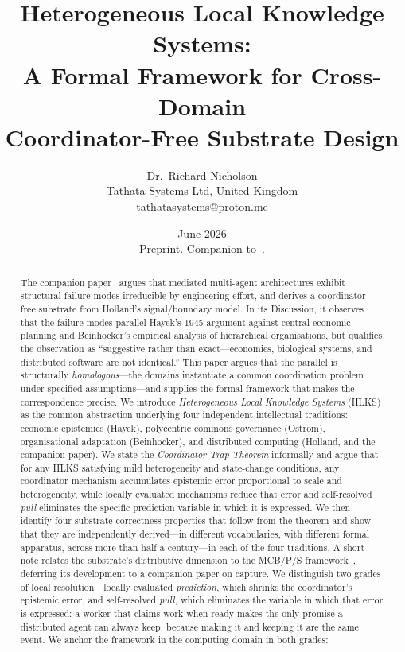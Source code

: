 \documentclass[11pt]{article}
\title{\textbf{Heterogeneous Local Knowledge Systems:\\
A Formal Framework for Cross-Domain\\
Coordinator-Free Substrate Design}}
\author{%
  Dr.\ Richard Nicholson\\[4pt]
  \small Tathata Systems Ltd, United Kingdom\\
  \small \href{mailto:tathatasystems@proton.me}{tathatasystems@proton.me}
}
\date{June 2026\\[4pt]
\small Preprint. Companion to~\cite{nicholson2026}.}
\theoremstyle{definition}
\theoremstyle{plain}
\theoremstyle{plain}
\begin{document}
\maketitle

\begin{abstract}
The companion paper~\cite{nicholson2026} argues that mediated multi-agent
architectures exhibit structural failure modes irreducible by engineering effort,
and derives a coordinator-free substrate from Holland's signal/boundary model. In
its Discussion, it observes that the failure modes parallel Hayek's 1945
argument against central economic planning and Beinhocker's empirical analysis
of hierarchical organisations, but qualifies the observation as ``suggestive
rather than exact---economies, biological systems, and distributed software are
not identical.'' This paper argues that the parallel is structurally
\emph{homologous}---the domains instantiate a common coordination problem under
specified assumptions---and supplies the formal framework that makes the
correspondence precise. We introduce
\emph{Heterogeneous Local Knowledge Systems} (HLKS) as the common abstraction
underlying four independent intellectual traditions: economic epistemics
(Hayek), polycentric commons governance (Ostrom), organisational adaptation
(Beinhocker), and distributed computing (Holland, and the companion paper). We
state the \emph{Coordinator Trap Theorem} informally and argue that for any
HLKS satisfying mild heterogeneity and state-change conditions, any coordinator
mechanism accumulates epistemic error proportional to scale and heterogeneity,
while locally evaluated mechanisms reduce that error and self-resolved \emph{pull}
eliminates the specific prediction variable in which it is expressed. We then identify four
substrate correctness properties that follow from the theorem and show that
they are independently derived---in different vocabularies, with different
formal apparatus, across more than half a century---in each of the four
traditions. A short note relates the substrate's
distributive dimension to the MCB/P/S framework~\cite{nicholson2025}, deferring its
development to a companion paper on capture. We distinguish two grades of local
resolution---locally evaluated
\emph{prediction}, which shrinks the coordinator's epistemic error, and
self-resolved \emph{pull}, which eliminates the variable in which that error
is expressed: a worker that claims work when ready makes the only promise a
distributed agent can always keep, because making it and keeping it are the
same event. We anchor the framework in the computing domain in both grades:

\end{abstract}
\end{document}
